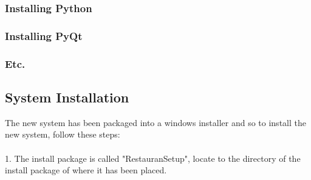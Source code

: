 \subsubsection{Installing Python}

\subsubsection{Installing PyQt}

\subsubsection{Etc.}

\subsection{System Installation}

The new system has been packaged into a windows installer and so to install the new system, follow these steps: \\
\\ 1. The install package is called "RestauranSetup", locate to the directory of the install package of where it has been placed. 

